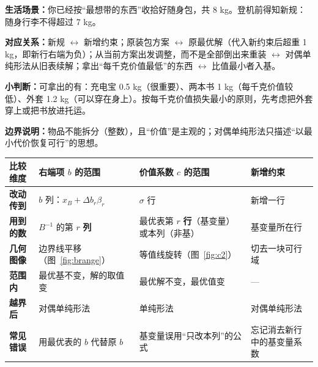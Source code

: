 \begin{lifebox}
\begin{minipage}[t]{0.55\linewidth}
\textbf{生活场景：}你已经按“最想带的东西”收拾好随身包，共 8 kg。登机前得知新规：随身行李不得超过 7 kg。\par
\textbf{对应关系：}新规 $\leftrightarrow$ 新增约束；原装包方案 $\leftrightarrow$ 原最优解（代入新约束后超重 1 kg，即新行右端为负）；从当前方案出发调整，而不是全部倒出来重装 $\leftrightarrow$ 对偶单纯形法从旧表续解；拿出“每千克价值最低”的东西 $\leftrightarrow$ 比值最小者入基。\par
\textbf{小判断：}可拿出的有：充电宝 0.5 kg（很重要）、两本书 1 kg（每千克价值较低）、外套 1.2 kg（可以穿在身上）。按每千克价值损失最小的原则，先考虑把外套穿上或把书放进托运。\par
\textbf{边界说明：}物品不能拆分（整数），且“价值”是主观的；对偶单纯形法只描述“以最小代价恢复可行”的思想。
\end{minipage}\hfill
\begin{minipage}[t]{0.41\linewidth}\vspace{0pt}\centering
{}
\end{minipage}
\end{lifebox}

\begin{table}[!htbp]\centering
\small
\begin{tabularx}{\linewidth}{@{}>{\bfseries}l>{\raggedright\arraybackslash}X>{\raggedright\arraybackslash}X>{\raggedright\arraybackslash}X@{}}
\toprule
\rowcolor{lightblue}比较维度 & 右端项 $b$ 的范围 & 价值系数 $c$ 的范围 & 新增约束\\\midrule
改动传到 & $b$ 列：$x_B+\Delta b_r\beta_r$ & $\sigma$ 行 & 新增一行\\
用到的数 & $B^{-1}$ 的第 $r$ \textbf{列} & 最优表第 $r$ \textbf{行}（基变量）或本列（非基） & 基变量所在行\\
几何图像 & 边界线平移（图~\ref{fig:brange}） & 等值线旋转（图~\ref{fig:c2}） & 切去一块可行域\\
范围内 & 最优基不变，解的取值变 & 最优解不变，最优值变 & ---\\
越界后 & 对偶单纯形法 & 单纯形法 & 对偶单纯形法\\
常见错误 & 用最优表的 $b$ 代替原 $b$ & 基变量误用“只改本列”的公式 & 忘记消去新行中的基变量系数\\\bottomrule
\end{tabularx}\par\nopagebreak[4]
\label{tab:sacmp}
\end{table}

